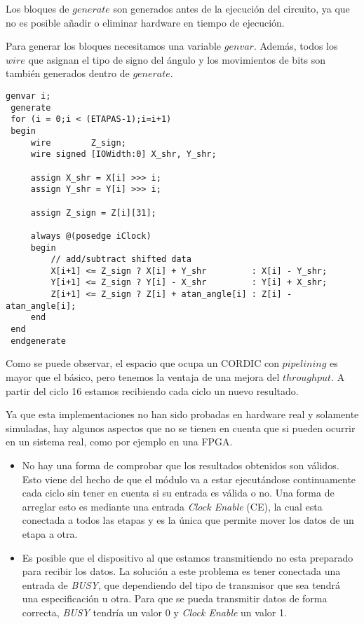 Los bloques de $generate$ son generados antes de la ejecución del circuito, ya que no es posible añadir o eliminar hardware en tiempo de ejecución.

Para generar los bloques necesitamos una variable $genvar$. Además, todos los $wire$ que asignan el tipo de signo del ángulo y los movimientos de bits son también generados dentro de $generate$.

\begin{lstlisting}[caption={Ejecución principal de CORDIC con \textit{pipelining}}]
 genvar i;
 generate
 for (i = 0;i < (ETAPAS-1);i=i+1) 
 begin
     wire        Z_sign;
     wire signed [IOWidth:0] X_shr, Y_shr;

     assign X_shr = X[i] >>> i; 
     assign Y_shr = Y[i] >>> i;

     assign Z_sign = Z[i][31];
         
     always @(posedge iClock)
     begin
         // add/subtract shifted data
         X[i+1] <= Z_sign ? X[i] + Y_shr         : X[i] - Y_shr;
         Y[i+1] <= Z_sign ? Y[i] - X_shr         : Y[i] + X_shr;
         Z[i+1] <= Z_sign ? Z[i] + atan_angle[i] : Z[i] - atan_angle[i];
     end 
 end     
 endgenerate
\end{lstlisting}

Como se puede observar, el espacio que ocupa un CORDIC con $pipelining$ es mayor que el básico, pero tenemos la ventaja de una mejora del $throughput$. A partir del ciclo 16 estamos recibiendo cada ciclo un nuevo resultado.

Ya que esta implementaciones no han sido probadas en hardware real y solamente simuladas, hay algunos aspectos que no se tienen en cuenta que si pueden ocurrir en un sistema real, como por ejemplo en una FPGA.

\begin{itemize}
	\item No hay una forma de comprobar que los resultados obtenidos son válidos. Esto viene del hecho de que el módulo va a estar ejecutándose continuamente cada ciclo sin tener en cuenta si su entrada es válida o no. Una forma de arreglar esto es mediante una entrada \textit{Clock Enable} (CE), la cual esta conectada a todos las etapas y es la única que permite mover los datos de un etapa a otra.
	
	\item Es posible que el dispositivo al que estamos transmitiendo no esta preparado para recibir los datos. La solución a este problema es tener conectada una entrada de \textit{BUSY}, que dependiendo del tipo de transmisor que sea tendrá una especificación u otra. Para que se pueda transmitir datos de forma correcta, \textit{BUSY} tendría un valor 0 y \textit{Clock Enable} un valor 1.
\end{itemize}
 

